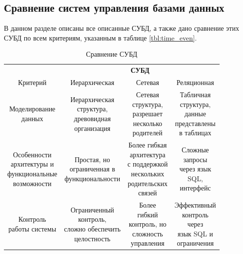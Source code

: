 \subsection{Сравнение систем управления базами данных}
В данном разделе описаны все описанные СУБД, а также дано сравнение этих СУБД по всем критериям, указанным в таблице \ref{tbl:time_even}.
\begin{table}[h]
	\begin{center}
		\begin{threeparttable}
			\captionsetup{justification=raggedright,singlelinecheck=off}
			\caption{Сравнение СУБД}
			\label{tbl:table1}
			\begin{tabular}{|c|c|c|c|}
				\hline
				&\multicolumn{3}{c|}{\bfseries СУБД} \\\cline{2-4}
				Критерий & Иерархическая & Сетевая & Реляционная\\
				\hline \makecell{Моделирование\\ данных} & \makecell{Иерархическая\\структура,\\древовидная\\ организация}& \makecell{Сетевая\\структура,\\разрешает\\несколько\\родителей}& \makecell{Табличная\\структура,\\данные\\представлены\\в таблицах}\\	
				\hline \makecell{Особенности\\архитектуры  и\\функциональные\\возможности} & \makecell{Простая, но\\ограниченная в\\ функциональности} &\makecell{Более гибкая\\ архитектура\\ с поддержкой\\ нескольких\\ родительских\\связей}&\makecell{Сложные\\запросы\\через язык\\SQL,\\ интерфейс}\\
				\hline \makecell{Контроль\\работы системы} &\makecell{Ограниченный\\контроль,\\сложно обеспечить\\целостность}&\makecell{Более\\гибкий\\контроль, но\\сложность\\ управления}&\makecell{Эффективный\\контроль\\через\\язык SQL и\\ограничения}\\

\end{tabular}
\end{threeparttable}
\end{center}
\end{table}
